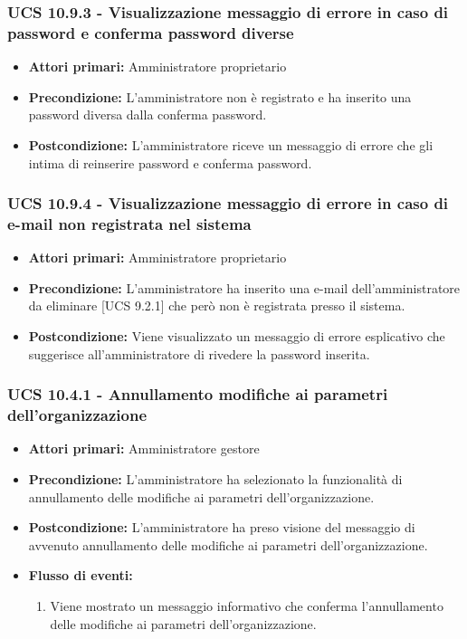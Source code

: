 \subsubsection{UCS 10.9.3 - Visualizzazione messaggio di errore in caso di password e conferma password diverse}%
\begin{itemize}
\item \textbf{Attori primari:} Amministratore proprietario
\item \textbf{Precondizione:} L'amministratore non è registrato e ha inserito una password diversa dalla conferma password.
\item \textbf{Postcondizione:} L'amministratore riceve un messaggio di errore che gli intima di reinserire password e conferma password.
\end{itemize}

\subsubsection{UCS 10.9.4 - Visualizzazione messaggio di errore in caso di e-mail non registrata nel sistema}%
\begin{itemize}
\item \textbf{Attori primari:} Amministratore proprietario
\item \textbf{Precondizione:} L'amministratore ha inserito una e-mail dell'amministratore da eliminare [UCS 9.2.1] che però non è registrata presso il sistema.
\item \textbf{Postcondizione:} Viene visualizzato un messaggio di errore esplicativo che suggerisce all'amministratore di rivedere la password inserita.
\end{itemize}

\subsubsection{UCS 10.4.1 - Annullamento modifiche ai parametri dell'organizzazione}%
\begin{itemize}
\item \textbf{Attori primari:} Amministratore gestore
\item \textbf{Precondizione:} L'amministratore ha selezionato la funzionalità di annullamento delle modifiche ai parametri dell'organizzazione.
\item \textbf{Postcondizione:} L'amministratore ha preso visione del messaggio di avvenuto annullamento delle modifiche ai parametri dell'organizzazione.
\item \textbf{Flusso di eventi:}
    \begin{enumerate}
        \item Viene mostrato un messaggio informativo che conferma l'annullamento delle modifiche ai parametri dell'organizzazione.
    \end{enumerate} 
\end{itemize}


